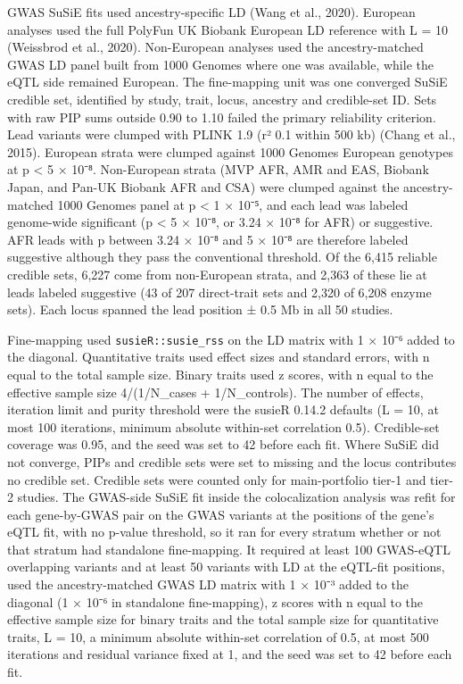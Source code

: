 GWAS SuSiE fits used ancestry-specific LD (Wang et al., 2020). European analyses used the full PolyFun UK Biobank European LD reference with L = 10 (Weissbrod et al., 2020). Non-European analyses used the ancestry-matched GWAS LD panel built from 1000 Genomes where one was available, while the eQTL side remained European. The fine-mapping unit was one converged SuSiE credible set, identified by study, trait, locus, ancestry and credible-set ID. Sets with raw PIP sums outside 0.90 to 1.10 failed the primary reliability criterion. Lead variants were clumped with PLINK 1.9 (r² 0.1 within 500 kb) (Chang et al., 2015). European strata were clumped against 1000 Genomes European genotypes at p \textless{} 5 × 10⁻⁸. Non-European strata (MVP AFR, AMR and EAS, Biobank Japan, and Pan-UK Biobank AFR and CSA) were clumped against the ancestry-matched 1000 Genomes panel at p \textless{} 1 × 10⁻⁵, and each lead was labeled genome-wide significant (p \textless{} 5 × 10⁻⁸, or 3.24 × 10⁻⁸ for AFR) or suggestive. AFR leads with p between 3.24 × 10⁻⁸ and 5 × 10⁻⁸ are therefore labeled suggestive although they pass the conventional threshold. Of the 6,415 reliable credible sets, 6,227 come from non-European strata, and 2,363 of these lie at leads labeled suggestive (43 of 207 direct-trait sets and 2,320 of 6,208 enzyme sets). Each locus spanned the lead position ± 0.5 Mb in all 50 studies.

Fine-mapping used \texttt{susieR::susie\_\allowbreak{}rss} on the LD matrix with 1 × 10⁻⁶ added to the diagonal. Quantitative traits used effect sizes and standard errors, with n equal to the total sample size. Binary traits used z scores, with n equal to the effective sample size 4/(1/N\_\allowbreak{}cases + 1/N\_\allowbreak{}controls). The number of effects, iteration limit and purity threshold were the susieR 0.14.2 defaults (L = 10, at most 100 iterations, minimum absolute within-set correlation 0.5). Credible-set coverage was 0.95, and the seed was set to 42 before each fit. Where SuSiE did not converge, PIPs and credible sets were set to missing and the locus contributes no credible set. Credible sets were counted only for main-portfolio tier-1 and tier-2 studies. The GWAS-side SuSiE fit inside the colocalization analysis was refit for each gene-by-GWAS pair on the GWAS variants at the positions of the gene's eQTL fit, with no p-value threshold, so it ran for every stratum whether or not that stratum had standalone fine-mapping. It required at least 100 GWAS-eQTL overlapping variants and at least 50 variants with LD at the eQTL-fit positions, used the ancestry-matched GWAS LD matrix with 1 × 10⁻³ added to the diagonal (1 × 10⁻⁶ in standalone fine-mapping), z scores with n equal to the effective sample size for binary traits and the total sample size for quantitative traits, L = 10, a minimum absolute within-set correlation of 0.5, at most 500 iterations and residual variance fixed at 1, and the seed was set to 42 before each fit.

